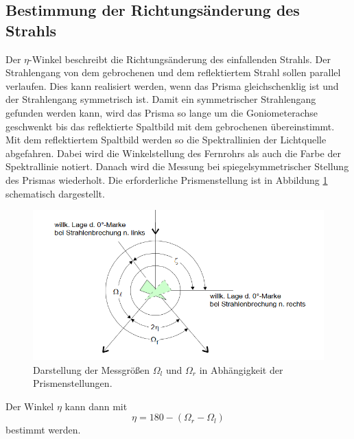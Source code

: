 \subsection{Bestimmung der Richtungsänderung des Strahls}
Der $\eta$-Winkel beschreibt die Richtungsänderung des einfallenden Strahls.
Der Strahlengang von dem gebrochenen und dem reflektiertem Strahl sollen parallel verlaufen.
Dies kann realisiert werden, wenn das Prisma gleichschenklig ist und der Strahlengang symmetrisch ist.
Damit ein symmetrischer Strahlengang gefunden werden kann, wird das Prisma so lange um die Goniometerachse geschwenkt bis das reflektierte Spaltbild mit dem gebrochenen übereinstimmt.
Mit dem reflektiertem Spaltbild werden so die Spektrallinien der Lichtquelle abgefahren.
Dabei wird die Winkelstellung des Fernrohrs als auch die Farbe der Spektrallinie notiert.
Danach wird die Messung bei spiegelsymmetrischer Stellung des Prismas wiederholt.
Die erforderliche Prismenstellung ist in Abbildung \ref{fig:eta} schematisch dargestellt.
\begin{figure}[H]
  \centering
  \includegraphics[width=\textwidth]{content/eta.png}
  \caption{Darstellung der Messgrößen $\Omega_l$ und $\Omega_r$ in Abhängigkeit der Prismenstellungen\cite{v402}.}
  \label{fig:eta}
\end{figure}
\noindent Der Winkel $\eta$ kann dann mit
\begin{equation}
  \label{eq:eta}
  \eta = 180 -(\Omega_r - \Omega_l)
\end{equation}
bestimmt werden.
